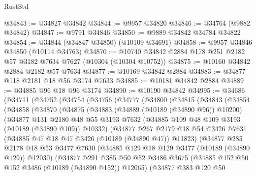 \begin{lexlean}{RustStd}
\begin{coremodule}
@34843 := @34827 @34842
@34844 := @9957 @34820
@34846 := @34764 (@9882 @34842)
@34847 := @9791 @34846
@34850 := @9889 @34842 @34784 @34822
@34854 := @34844 (@34847 @34850) (@10109 @34691)
@34858 := @9957 @34846 @34850 (@10114 @34763)
@34870 := @10740 @34842 @2884 @178 @251 @2182 @57 @3182 @7634 @7627 (@10304 (@10304 @10752))
@34875 := @10160 @34842 @2884 @2182 @57 @7634
@34877 := @10169 @34842 @2884
@34883 := @34877 @118 @2181 @18 @56 @3174 @7633
@34885 := @10181 @34842 @2884
@34889 := @34885 @96 @18 @96 @3174
@34890 := @10190 @34842
@34995 := @34686
    (@34711
      (@34752
        (@34754
          (@34756
            (@34777
              (@34800
                (@34815
                  (@34843
                    (@34854
                      (@34858
                        (@34870
                          (@34875
                            (@34883
                              (@34889 (@10189 (@34890 @96)) @10200)
                              (@34877
                                @131
                                @2180
                                @48
                                @55
                                @3193
                                @7632
                                (@34885 @109 @48 @109 @3193 (@10189 (@34890 @109)) @10332)
                                (@34877
                                  @267
                                  @2179
                                  @18
                                  @54
                                  @3426
                                  @7631
                                  (@34885 @47 @18 @47 @3426 (@10189 (@34890 @47)) @11823)
                                  (@34877
                                    @285
                                    @2178
                                    @18
                                    @53
                                    @3477
                                    @7630
                                    (@34885 @129 @18 @129 @3477 (@10189 (@34890 @129)) @12030)
                                    (@34877
                                      @291
                                      @385
                                      @50
                                      @52
                                      @3486
                                      @3675
                                      (@34885 @152 @50 @152 @3486 (@10189 (@34890 @152)) @12065)
                                      (@34877
                                        @383
                                        @120
                                        @50

\end{coremodule}
\end{lexlean}
